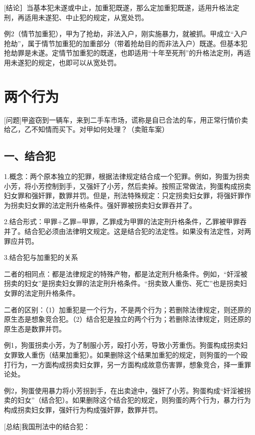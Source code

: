 [结论］当基本犯未遂或中止，加重犯既遂，那么定加重犯既遂，适用升格法定刑，再适用未遂犯、中止犯的规定，从宽处罚。

例2（情节加重犯），甲为了抢劫，非法入户，刚实施暴力，就被抓。甲成立“入户抢劫”，属于情节加重犯的加重部分（带着抢劫目的而非法入户）既遂。但基本犯抢劫罪是未遂。定情节加重犯的既遂，也即适用“十年至死刑”的升格法定刑，再适用未遂犯的规定，也即可以从宽处罚。

\section{两个行为}

[问题]甲盗窃到一辆车，来到二手车市场，谎称是自已合法的车，用正常行情价卖给乙，乙不知情而买下。对甲如何处理？（卖赃车案）

\subsection*{一、结合犯}

1.概念：两个原本独立的犯罪，根据法律规定结合成一个犯罪。例如，狗蛋为拐卖小芳，将小芳控制到手，又强奸了小芳，然后卖掉。按照正常做法，狗蛋构成拐卖妇女罪和强奸罪，数罪并罚。但是，刑法特殊规定：只定拐卖妇女罪，将强奸罪作为拐卖妇女罪的法定刑升格条件。强奸罪被拐卖妇女罪吞并了。

2.结合形式：甲罪+乙罪=甲罪，乙罪成为甲罪的法定刑升格条件，乙罪被甲罪吞并了。结合犯必须由法律明文规定。这是结合犯的法定性。如果没有法定性，对两罪应并罚。

3.结合犯与加重犯的关系

二者的相同点：都是法律规定的特殊产物，都是法定刑升格条件。例如，“奸淫被拐卖的妇女”是拐卖妇女罪的法定刑升格条件。“拐卖致人重伤、死亡”也是拐卖妇女罪的法定刑升格条件。

二者的区别：（1）加重犯是一个行为，不是两个行为；若删除法律规定，则还原的原生态是想象竞合犯。（2）结合犯是独立的两个行为；若删除法律规定，则还原的原生态是数罪并罚。

例1，狗蛋拐卖小芳，为了制服小芳，殴打小芳，导致小芳重伤。狗蛋构成拐卖妇女罪致人重伤（结果加重犯）。如果删除这个结果加重犯的规定，则狗蛋的一个殴打行为，一方面构成拐卖妇女罪，另一方面构成故意伤害罪，想象竞合，择一重罪论处。

例2，狗蛋使用暴力将小芳拐到手，在出卖途中，强奸了小芳。狗蛋构成“奸淫被拐卖的妇女”（结合犯）。如果删除这个结合犯的规定，则狗蛋的两个行为，暴力行为构成拐卖妇女罪，强奸行为构成强奸罪，数罪并罚。

[总结]我国刑法中的结合犯：

